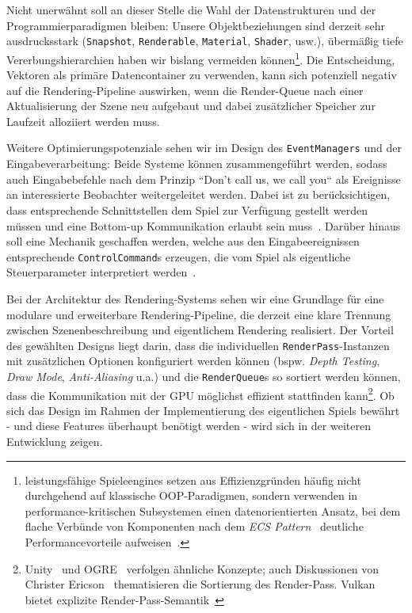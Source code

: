 Nicht unerwähnt soll an dieser Stelle die Wahl der Datenstrukturen und der Programmierparadigmen bleiben: Unsere Objektbeziehungen sind derzeit sehr ausdrucksstark (\texttt{Snapshot}, \texttt{Renderable}, \texttt{Material}, \texttt{Shader}, usw.), übermäßig tiefe Vererbungshierarchien haben wir bislang vermeiden können\footnote{
leistungsfähige Spieleengines setzen aus Effizienzgründen häufig nicht durchgehend auf klassische OOP-Paradigmen, sondern verwenden in performance-kritischen Subsystemen einen datenorientierten Ansatz, bei dem flache Verbünde von Komponenten nach dem \textit{ECS Pattern}~\cite[]{RCCK25} deutliche Performancevorteile aufweisen~\cite[]{WWM22}.
}.
Die Entscheidung, Vektoren als primäre Datencontainer zu verwenden, kann sich potenziell negativ auf die Rendering-Pipeline auswirken, wenn die Render-Queue nach einer Aktualisierung der Szene neu aufgebaut und dabei zusätzlicher Speicher zur Laufzeit alloziiert werden muss.\par

Weitere Optimierungspotenziale sehen wir im Design des \texttt{EventManagers} und der Eingabeverarbeitung: Beide Systeme können zusammengeführt werden, sodass auch Eingabebefehle nach dem Prinzip ``Don't call us, we call you`` als Ereignisse an interessierte Beobachter weitergeleitet werden.
Dabei ist zu berücksichtigen, dass entsprechende Schnittstellen dem Spiel zur Verfügung gestellt werden müssen und eine Bottom-up Kommunikation erlaubt sein muss~\cite[]{BMRS+96}.
Darüber hinaus soll eine Mechanik geschaffen werden, welche aus den Eingabeereignissen entsprechende \texttt{ControlCommand}s erzeugen, die vom Spiel als eigentliche  Steuerparameter interpretiert werden~\cite[21 ff.]{Nys14}.\par

Bei der Architektur des Rendering-Systems sehen wir eine Grundlage für eine modulare und erweiterbare Rendering-Pipeline, die derzeit eine klare Trennung zwischen Szenenbeschreibung und eigentlichem Rendering realisiert.
Der Vorteil des gewählten Designs liegt darin, dass die individuellen \texttt{RenderPass}-Instanzen mit zusätzlichen Optionen konfiguriert werden können (bspw. \textit{Depth Testing}, \textit{Draw Mode}, \textit{Anti-Aliasing} u.a.) und die \texttt{RenderQueue}s so sortiert werden können, dass die Kommunikation mit der GPU möglichst effizient stattfinden kann\footnote{
    Unity~\cite[]{UnityRenderQueue} und OGRE~\cite[]{OgreRenderQueue} verfolgen ähnliche Konzepte; auch Diskussionen von Christer Ericson~\cite[]{ChristerEricson} thematisieren die Sortierung des Render-Pass. Vulkan bietet explizite Render-Pass-Semantik~\cite[]{VulkanRenderPass}
}.
Ob sich das Design im Rahmen der Implementierung des eigentlichen Spiels bewährt - und diese Features überhaupt benötigt werden - wird sich in der weiteren Entwicklung zeigen.\par




